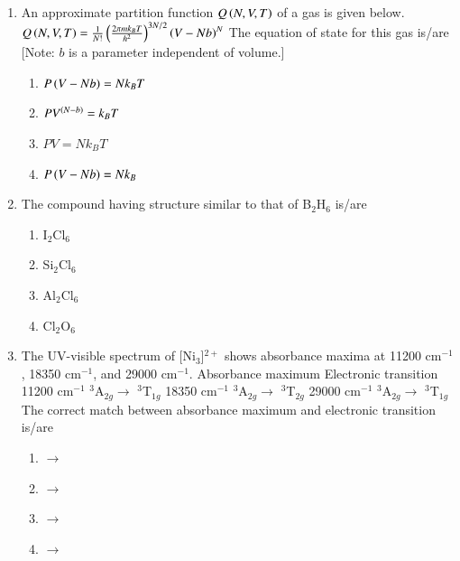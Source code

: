 \documentclass[journal,12pt,onecolumn]{IEEEtran}
\theoremstyle{remark}
\begin{document}
\begin{enumerate}
\item An approximate partition function $Q\left(N, V, T\right)$ of a gas is given below. $Q\left(N, V, T\right) = \frac{1}{N!}\left(\frac{2\pi mk_{B}T}{h^{2}}\right)^{3N/2}\left(V - Nb\right)^{N}$ The equation of state for this gas is/are [Note: $b$ is a parameter independent of volume.]
    \begin{enumerate}
        \item $P\left(V - Nb\right) = Nk_{B}T$
        \item $PV^{\left(N-b\right)} = k_{B}T$
        \item $PV = Nk_{B}T$
        \item $P\left(V - Nb\right) = Nk_{B}$
    \end{enumerate}      \hfill{}



\item The compound having structure similar to that of B$_{2}$H$_{6}$ is/are
    \begin{enumerate}
        \item I$_{2}$Cl$_{6}$
        \item Si$_{2}$Cl$_{6}$
        \item Al$_{2}$Cl$_{6}$
        \item Cl$_{2}$O$_{6}$
    \end{enumerate}      \hfill{}



\item The UV-visible spectrum of [Ni$_{3}$]$^{2+}$  shows absorbance maxima at 11200 cm$^{-1}$, 18350 cm$^{-1}$, and 29000 cm$^{-1}$. Absorbance maximum Electronic transition  11200 cm$^{-1}$  $^{3}$A$_{2g}$$\to$ $^{3}$T$_{1g}$   18350 cm$^{-1}$  $^{3}$A$_{2g}$$\to$ $^{3}$T$_{2g}$  29000 cm$^{-1}$  $^{3}$A$_{2g}$$\to$ $^{3}$T$_{1g}$   The correct match between absorbance maximum and electronic transition is/are
    \begin{enumerate}
        \item {} $\to$ 
        \item {} $\to$ 
        \item {} $\to$ 
        \item {} $\to$ 
    \end{enumerate}      \hfill{}




\end{enumerate}
\end{document}
